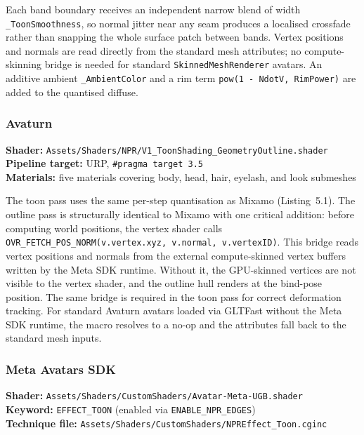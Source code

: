 Each band boundary receives an independent narrow blend of width \texttt{\_ToonSmoothness}, so normal jitter near any seam produces a localised crossfade rather than snapping the whole surface patch between bands. Vertex positions and normals are read directly from the standard mesh attributes; no compute-skinning bridge is needed for standard \texttt{Skinned\-Mesh\-Renderer} avatars. An additive ambient \texttt{\_AmbientColor} and a rim term \texttt{pow(1 - NdotV, RimPower)} are added to the quantised diffuse.

\subsubsection{Avaturn}
\label{sec:impl_v1_avaturn}

\textbf{Shader:} \texttt{Assets/Shaders/NPR/V1\_ToonShading\_GeometryOutline.shader} \\
\textbf{Pipeline target:} URP, \texttt{\#pragma target 3.5} \\
\textbf{Materials:} five materials covering body, head, hair, eyelash, and look submeshes

The toon pass uses the same per-step quantisation as Mixamo (Listing~5.1). The outline pass is structurally identical to Mixamo with one critical addition: before computing world positions, the vertex shader calls \texttt{OVR\_FETCH\_POS\_NORM(v.vertex.xyz, v.normal, v.vertexID)}. This bridge reads vertex positions and normals from the external compute-skinned vertex buffers written by the Meta SDK runtime. Without it, the GPU-skinned vertices are not visible to the vertex shader, and the outline hull renders at the bind-pose position. The same bridge is required in the toon pass for correct deformation tracking. For standard Avaturn avatars loaded via GLTFast without the Meta SDK runtime, the macro resolves to a no-op and the attributes fall back to the standard mesh inputs.

\subsubsection{Meta Avatars SDK}
\label{sec:impl_v1_meta}

\textbf{Shader:} \texttt{Assets/Shaders/CustomShaders/Avatar-Meta-UGB.shader} \\
\textbf{Keyword:} \texttt{EFFECT\_TOON} (enabled via \texttt{ENABLE\_NPR\_EDGES}) \\
\textbf{Technique file:} \texttt{Assets/Shaders/CustomShaders/NPREffect\_Toon.cginc}


